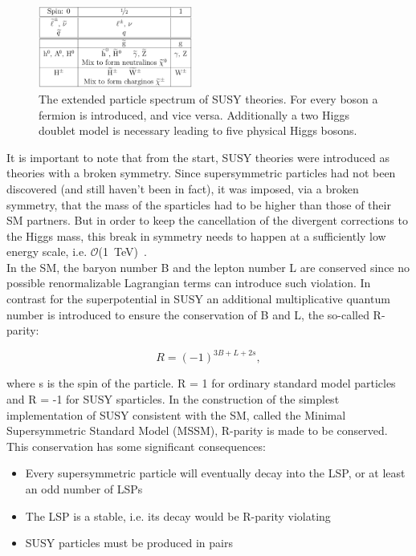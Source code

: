 \begin{figure}[h!t]
  \begin{center}
       \includegraphics[width=0.45\textwidth,]{figures/sparticleTable.png}
       \caption{The extended particle spectrum of SUSY theories. For every boson a fermion
       is introduced, and vice versa. Additionally a two Higgs doublet model is necessary 
       leading to five physical Higgs bosons.}
    \label{tab:sparticleTable}
  \end{center}
\end{figure}

It is important to note that from the start, SUSY theories were introduced as theories with a 
broken symmetry. Since supersymmetric particles had not been discovered (and still haven't been in fact), 
it was imposed, via a broken symmetry, that the mass of the sparticles had to be higher than 
those of their SM partners. But in order to keep the cancellation of the divergent corrections to 
the Higgs mass, this break in symmetry needs to happen at a sufficiently low energy scale, 
i.e. $\mathcal{O}$(1~TeV)~\cite{ramond1999journeys}.\\
\indent In the SM, the baryon number B and the lepton number L are conserved since no possible 
renormalizable Lagrangian terms can introduce such violation. In contrast for the superpotential in 
SUSY an additional multiplicative quantum number is introduced to ensure the conservation of B and L, the so-called R-parity:

\begin{equation}
\label{eq:r-par}
R = \left(-1\right)^{3B+L+2s},
\end{equation}

where s is the spin of the particle. R = 1 for ordinary standard model particles and R = -1 for SUSY sparticles.
In the construction of the simplest implementation of SUSY consistent with the SM, called the Minimal 
Supersymmetric Standard Model (MSSM), R-parity is made to be conserved. This conservation has some significant consequences:

\begin{itemize}
\item{Every supersymmetric particle will eventually decay into the LSP, or at least an odd
number of LSPs}
\item{The LSP is a stable, i.e. its decay would be R-parity violating}
\item{SUSY particles must be produced in pairs}
\end{itemize}

